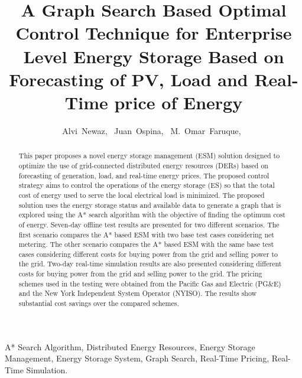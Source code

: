 \documentclass[journal]{IEEEtran}
\begin{document}
\title{A Graph Search Based Optimal Control Technique for Enterprise Level Energy Storage Based on Forecasting of PV, Load and Real-Time price of Energy}

\author{ Alvi~Newaz,~
Juan~Ospina,~
     M.~Omar~Faruque,~
        }%
        


\maketitle                                                               

\begin{abstract}
This paper proposes a novel energy storage management (ESM) solution designed to optimize the use of grid-connected distributed energy resources (DERs) based on forecasting of generation, load, and real-time energy prices. The proposed control strategy aims to control the operations of the energy storage (ES) so that the total cost of energy used to serve the local electrical load is minimized. The proposed solution uses the energy storage status and available data to generate a graph that is explored using the A* search algorithm with the objective of finding the optimum cost of energy. Seven-day offline test results are presented for two different scenarios. The first scenario compares the A* based ESM with two base test cases considering net metering. The other scenario compares the A* based ESM with the same base test cases considering different costs for buying power from the grid and selling power to the grid. Two-day real-time simulation results are also presented considering different costs for buying power from the grid and selling power to the grid. The pricing schemes used in the testing were obtained from the Pacific Gas and Electric (PG\&E) and the New York Independent System Operator (NYISO). The results show substantial cost savings over the compared schemes. %
\end{abstract}

\begin{IEEEkeywords}
 A* Search Algorithm, Distributed Energy Resources, Energy Storage Management, Energy Storage System, Graph Search, Real-Time Pricing, Real-Time Simulation.
\end{IEEEkeywords}

\IEEEpeerreviewmaketitle
\end{document}

